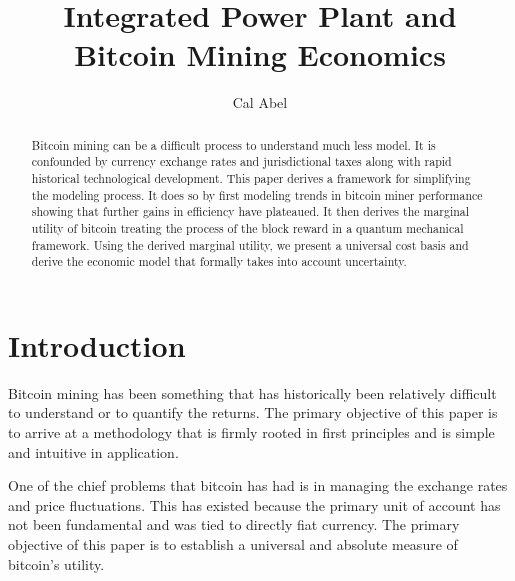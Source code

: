 \documentclass[runningheads]{llncs}
\begin{document}
%
\title{Integrated Power Plant and Bitcoin Mining Economics}
%
%
\author{Cal Abel}
%
%
%
\maketitle
%
\begin{abstract}
Bitcoin mining can be a difficult process to understand much less model.
It is confounded by currency exchange rates and jurisdictional taxes along with rapid historical technological development.
This paper derives a framework for simplifying the modeling process.
It does so by first modeling trends in bitcoin miner performance showing that further gains in efficiency have plateaued.
It then derives the marginal utility of bitcoin treating the process of the block reward in a quantum mechanical framework.
Using the derived marginal utility, we present a universal cost basis and derive the economic model that formally takes into account uncertainty.
%
\end{abstract}



\section{Introduction}

Bitcoin mining has been something that has historically been relatively difficult to understand or to quantify the returns.
The primary objective of this paper is to arrive at a methodology that is firmly rooted in first principles and is simple and intuitive in application.

One of the chief problems that bitcoin has had is in managing the exchange rates and price fluctuations.
This has existed because the primary unit of account has not been fundamental and was tied to directly fiat currency.
The primary objective of this paper is to establish a universal and absolute measure of bitcoin's utility.
\end{document}
